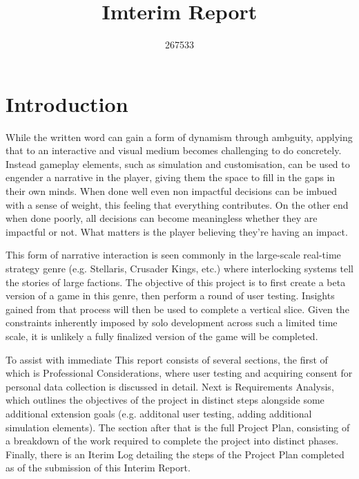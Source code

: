 \documentclass{report}
\begin{document}
\title{Imterim Report}
\author{267533}

\maketitle

\section{Introduction}
While the written word can gain a form of dynamism through ambguity, applying that to an interactive and visual medium becomes challenging to do concretely. Instead gameplay elements, such as simulation and customisation, can be used to engender a narrative in the player, giving them the space to fill in the gaps in their own minds. When done well even non impactful decisions can be imbued with a sense of weight, this feeling that everything contributes. On the other end when done poorly, all decisions can become meaningless whether they are impactful or not. What matters is the player believing they're having an impact. 

This form of narrative interaction is seen commonly in the large-scale real-time strategy genre (e.g. Stellaris, Crusader Kings, etc.) where interlocking systems tell the stories of large factions. The objective of this project is to first create a beta version of a game in this genre, then perform a round of user testing. Insights gained from that process will then be used to complete a vertical slice. Given the constraints inherently imposed by solo development across such a limited time scale, it is unlikely a fully finalized version of the game will be completed.


To assist with immediate 
\newline
\newline
This report consists of several sections, the first of which is Professional Considerations, where user testing and acquiring consent for personal data collection is discussed in detail. Next is Requirements Analysis, which outlines the objectives of the project in distinct steps alongside some additional extension goals (e.g. additonal user testing, adding additional simulation elements). The section after that is the full Project Plan, consisting of a breakdown of the work required to complete the project into distinct phases. Finally, there is an Iterim Log detailing the steps of the Project Plan completed as of the submission of this Interim Report.
\end{document}
